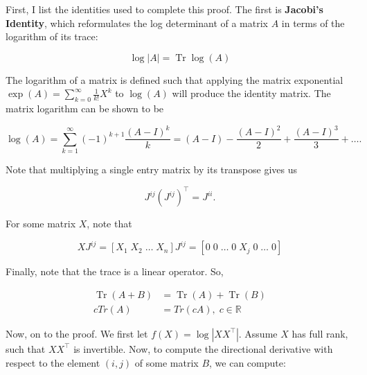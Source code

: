 \documentclass{article}
\theoremstyle{definition}
\DeclareMathOperator{\Tr}{Tr}
\begin{document}
First, I list the identities used to complete this proof. The first is \textbf{Jacobi's Identity}, which reformulates the log determinant of a matrix $A$ in terms of the logarithm of its trace:

\begin{equation}
    \label{eqn:Jacobi}
    \log |A| = \Tr \log (A)
\end{equation}

The logarithm of a matrix is defined such that applying the matrix exponential $\exp(A) = \sum_{k=0}^{\infty} \frac{1}{k!} X^k$ to $\log(A)$ will produce the identity matrix. The matrix logarithm can be shown to be

\begin{equation}
    \label{eqn:matrixLog}
    \log(A) = \sum_{k=1}^{\infty} (-1)^{k+1} \frac{(A-I)^k}{k} = (A - I) - \frac{(A-I)^2}{2} + \frac{(A-I)^3}{3} + \dots.
\end{equation}

Note that multiplying a single entry matrix by its transpose gives us

\[
J^{ij} (J^{ij})^\top = J^{ii}.
\]

For some matrix $X$, note that

\[
XJ^{ij} = [X_1 \; X_2 \; \dots \; X_n] J^{ij} = [0 \; 0 \;  \dots \; 0 \; X_j \; 0 \; \dots \;  0]
\]

Finally, note that the trace is a linear operator. So,

\[
\begin{split}
    \Tr(A + B) & = \Tr(A) + \Tr(B) \\ 
    cTr(A) &= Tr(cA), \; c \in \mathbb{R}
\end{split}
\]

Now, on to the proof. We first let $f(X) = \log |XX^\top|$. Assume $X$ has full rank, such that $XX^\top$ is invertible. Now, to compute the directional derivative with respect to the element $(i,j)$ of some matrix $B$, we can compute:
\end{document}
